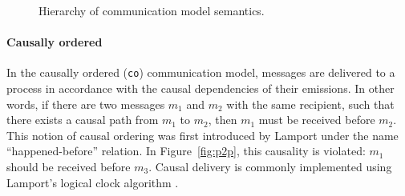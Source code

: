 \begin{figure}[!ht]
\centering
{}
\caption{Hierarchy of communication model semantics.}
\label{fig:coms}
\end{figure}


\paragraph{Causally ordered}
In the causally ordered (\verb|co|) communication model, messages are delivered 
to a process in accordance with the causal dependencies of their emissions. 
In other words, if there are two messages $m_1$ and $m_2$ with the same recipient, 
such that there exists a causal path from $m_1$ to $m_2$, then $m_1$ must be received 
before $m_2$. This notion of causal ordering was first introduced by Lamport under the 
name ``happened-before'' relation. In Figure~\ref{fig:p2p}, this 
causality is violated: $m_1$ should be received before $m_3$. Causal delivery 
is commonly implemented using Lamport's logical clock algorithm \cite{lamport2019time}.



